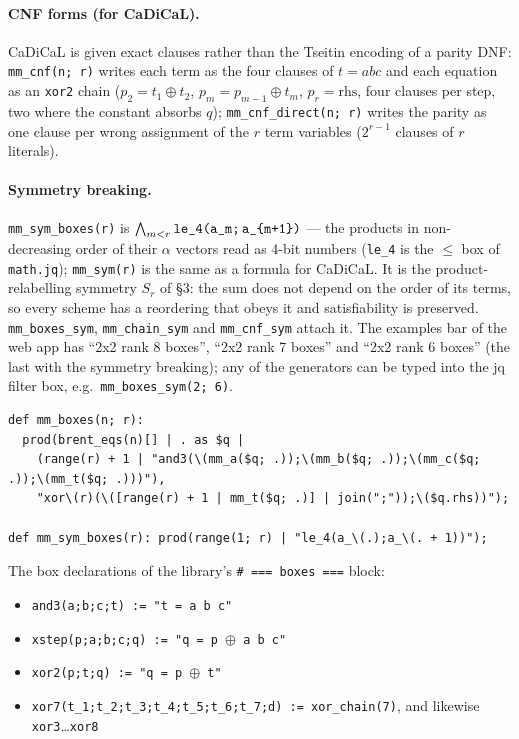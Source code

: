 \documentclass[10pt]{article}
\begin{document}
\paragraph{CNF forms (for CaDiCaL).}
CaDiCaL is given exact clauses rather than the Tseitin encoding of a
parity DNF: \texttt{mm\_cnf(n; r)} writes each term as the four clauses of
$t = abc$ and each equation as an \texttt{xor2} chain
($p_2 = t_1\oplus t_2$, $p_m = p_{m-1}\oplus t_m$, $p_r = \mathrm{rhs}$,
four clauses per step, two where the constant absorbs $q$);
\texttt{mm\_cnf\_direct(n; r)} writes the parity as one clause per wrong
assignment of the $r$ term variables ($2^{r-1}$ clauses of $r$ literals).

\paragraph{Symmetry breaking.}
\texttt{mm\_sym\_boxes(r)} is
$\bigwedge_{m<r}\texttt{le\_4(a\_m;\,a\_\{m+1\})}$ --- the products in
non-decreasing order of their $\alpha$ vectors read as 4-bit numbers
(\texttt{le\_4} is the $\le$ box of \texttt{math.jq}); \texttt{mm\_sym(r)}
is the same as a formula for CaDiCaL. It is the product-relabelling
symmetry $S_r$ of \S3: the sum does not depend on the order of its terms,
so every scheme has a reordering that obeys it and satisfiability is
preserved. \texttt{mm\_boxes\_sym}, \texttt{mm\_chain\_sym} and
\texttt{mm\_cnf\_sym} attach it. The examples bar of the web app has
``2x2 rank 8 boxes'', ``2x2 rank 7 boxes'' and ``2x2 rank 6 boxes'' (the
last with the symmetry breaking); any of the generators can be typed into
the jq filter box, e.g.\ \texttt{mm\_boxes\_sym(2; 6)}.

\begin{small}
\begin{verbatim}
def mm_boxes(n; r):
  prod(brent_eqs(n)[] | . as $q |
    (range(r) + 1 | "and3(\(mm_a($q; .));\(mm_b($q; .));\(mm_c($q; .));\(mm_t($q; .)))"),
    "xor\(r)(\([range(r) + 1 | mm_t($q; .)] | join(";"));\($q.rhs))");

def mm_sym_boxes(r): prod(range(1; r) | "le_4(a_\(.);a_\(. + 1))");
\end{verbatim}
\end{small}
The box declarations of the library's \texttt{\# === boxes ===} block:
\begin{itemize}
\item \texttt{and3(a;b;c;t) := "t = a b c"}
\item \texttt{xstep(p;a;b;c;q) := "q = p $\oplus$ a b c"}
\item \texttt{xor2(p;t;q) := "q = p $\oplus$ t"}
\item \texttt{xor7(t\_1;t\_2;t\_3;t\_4;t\_5;t\_6;t\_7;d) := xor\_chain(7)}, and likewise
  \texttt{xor3}\ldots\texttt{xor8}
\end{itemize}
\end{document}
